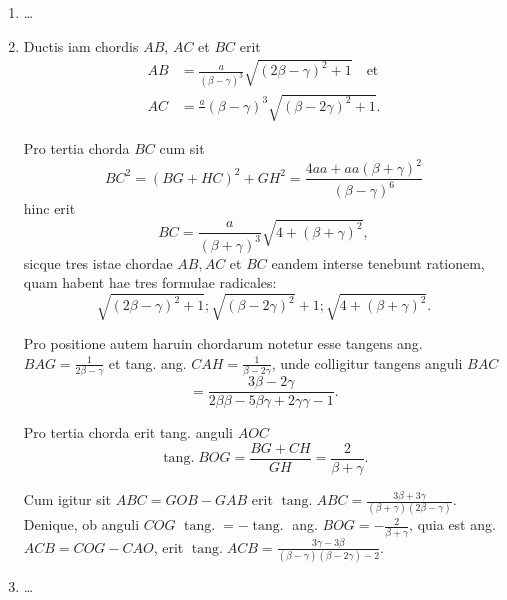 \documentclass[10pt,a4paper]{article}
\newcommand{\switchenum}{\setcounter{enumi}{\arabic{enumi}-1}\switchcolumn}
\DeclareMathOperator{\tang}{tang.}
\begin{document}
\begin{paracol}{2}
\begin{enumerate}[topsep=1px]
		\switchenum
		\item \ldots
		\switchcolumn*
		
		\item Ductis iam chordis $AB$, $AC$ et $BC$ erit 
		\begin{align*}
			AB &= \frac{a}{(\beta-\gamma)^3}\sqrt{(2\beta-\gamma)^2 +1} \quad \text{et}\\
			AC & = \frac{a}{}(\beta-\gamma)^3\sqrt{(\beta - 2\gamma)^2+1}.
		\end{align*}
		\par Pro tertia chorda $BC$ cum sit
		\[
			BC^2 = (BG + HC)^2 + GH^2 = \frac{4aa+aa(\beta+ \gamma)^2}{(\beta - \gamma )^6}
		\]
		hinc erit
		\[
			BC = \frac{a}{(\beta+\gamma)^3} \sqrt{4+(\beta+\gamma)^2},
		\]
		sicque tres istae chordae $AB, AC$ et $BC$ eandem interse tenebunt rationem, quam habent hae tres formulae radicales:
		\[
			\sqrt{(2\beta-\gamma)^2+1}; \sqrt{(\beta-2\gamma)^2}+1; \sqrt{4+(\beta+\gamma)^2}.
		\]
		\par Pro positione autem haruin chordarum notetur esse tangens ang. $BAG = \frac{1}{2\beta- \gamma}$ et tang. ang. $CAH = \frac{1}{\beta - 2\gamma}$, unde colligitur tangens anguli $BAC$
		\[
			= \frac{3\beta - 2\gamma}{2\beta \beta - 5\beta \gamma + 2\gamma \gamma -1}.
		\]
		\par Pro tertia chorda erit tang. anguli $AOC$
		\[
			\tang BOG = \frac{BG + CH}{GH} = \frac{2}{\beta + \gamma}.
		\] 
		\par Cum igitur sit $ABC = GOB - GAB$ erit $\tang ABC = \frac{3\beta + 3\gamma}{(\beta+\gamma)(2\beta - \gamma)}$. Denique, ob anguli $COG$ $\tang = -\tang$ ang. $BOG = -\frac{2}{\beta+\gamma}$, quia est ang. $ACB = COG-CAO$, erit $\tang ACB = \frac{3\gamma-3\beta}{(\beta - \gamma)(\beta - 2\gamma)-2}$.
		
		\switchenum
		\item \ldots
		\switchcolumn*
		

\end{enumerate}
\end{paracol}
\end{document}
